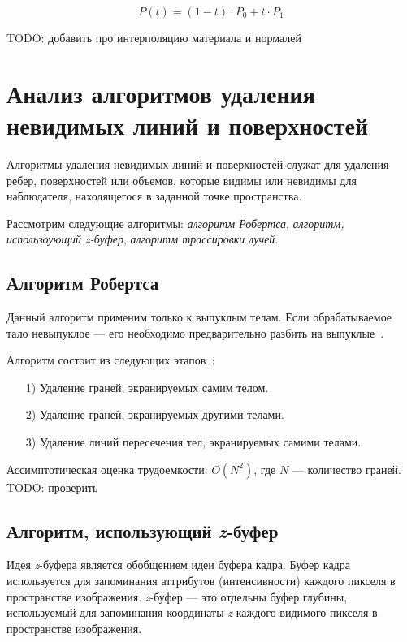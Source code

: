     \begin{equation}
    	\label{eq:lerp}
        P(t) = (1 - t) \cdot P_0 + t \cdot P_1
    \end{equation}

	TODO: добавить про интерполяцию материала и нормалей
	
    \section{Анализ алгоритмов удаления невидимых линий и поверхностей}
    
    Алгоритмы удаления невидимых линий и поверхностей служат для удаления ребер, поверхностей или объемов, которые видимы или невидимы для наблюдателя, находящегося в заданной точке пространства\cite{rogers}.
    
    Рассмотрим следующие алгоритмы: \textit{алгоритм Робертса}, \textit{алгоритм, использоующий z-буфер}, \textit{алгоритм трассировки лучей}.
    
   \subsection{Алгоритм Робертса}
   
   Данный алгоритм применим только к выпуклым телам. Если обрабатываемое тало невыпуклое --- его необходимо предварительно разбить на выпуклые~\cite{rogers}.
   
   Алгоритм состоит из следующих этапов~\cite{rogers}:
   \begin{enumerate}
   	\item[1)] Удаление граней, экранируемых самим телом.
   	\item[2)] Удаление граней, экранируемых другими телами.
   	\item[3)] Удаление линий пересечения тел, экранируемых самими телами.
   \end{enumerate}
   
   Ассимптотическая оценка трудоемкости: $O(N^2)$, где $N$ --- количество граней. TODO: проверить
   
   \subsection{Алгоритм, использующий \textit{z}-буфер}
   
   Идея \textit{z}-буфера является обобщением идеи буфера кадра. Буфер кадра используется для запоминания аттрибутов (интенсивности) каждого пикселя в пространстве изображения. \textit{z}-буфер --- это отдельны буфер глубины, используемый для запоминания координаты \textit{z} каждого видимого пикселя в пространстве изображения\cite{rogers}.
   
